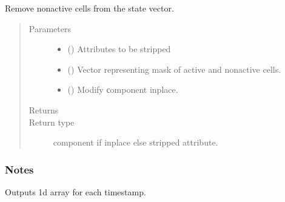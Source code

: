 \documentclass[letterpaper,10pt,english]{sphinxmanual}
\begin{document}
\begin{fulllineitems}
\begin{fulllineitems}
\end{fulllineitems}


\begin{fulllineitems}
\label{\detokenize{api/states:geology.src.States.strip_na}}
Remove non\sphinxhyphen{}active cells from the state vector.
\begin{quote}\begin{description}
\item[{Parameters}] \leavevmode\begin{itemize}
\item {} 
 (\sphinxstyleliteralemphasis{\sphinxupquote{, }}) \textendash{} Attributes to be stripped

\item {} 
 () \textendash{} Vector representing mask of active and non\sphinxhyphen{}active cells.

\item {} 
 () \textendash{} Modify сomponent inplace.

\end{itemize}

\item[{Returns}] \leavevmode
{}

\item[{Return type}] \leavevmode
component if inplace else stripped attribute.

\end{description}\end{quote}
\subsubsection*{Notes}

Outputs 1d array for each timestamp.


\end{fulllineitems}
\end{fulllineitems}
\end{document}
